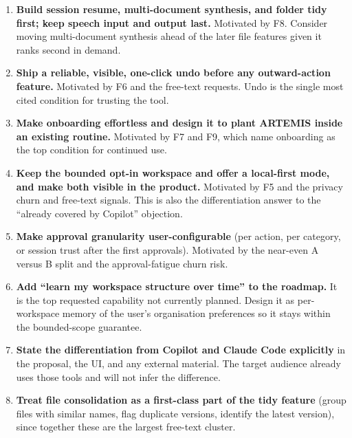 \documentclass[11pt]{article}
\begin{document}
\begin{enumerate}
  \item \textbf{Build session resume, multi-document synthesis, and folder tidy first; keep
        speech input and output last.} Motivated by F8. Consider moving multi-document synthesis
        ahead of the later file features given it ranks second in demand.
  \item \textbf{Ship a reliable, visible, one-click undo before any outward-action feature.}
        Motivated by F6 and the free-text requests. Undo is the single most cited condition for
        trusting the tool.
  \item \textbf{Make onboarding effortless and design it to plant ARTEMIS inside an existing
        routine.} Motivated by F7 and F9, which name onboarding as the top condition for
        continued use.
  \item \textbf{Keep the bounded opt-in workspace and offer a local-first mode, and make both
        visible in the product.} Motivated by F5 and the privacy churn and free-text signals.
        This is also the differentiation answer to the \enquote{already covered by Copilot}
        objection.
  \item \textbf{Make approval granularity user-configurable} (per action, per category, or
        session trust after the first approvals). Motivated by the near-even A versus B split
        and the approval-fatigue churn risk.
  \item \textbf{Add \enquote{learn my workspace structure over time} to the roadmap.} It is the
        top requested capability not currently planned. Design it as per-workspace memory of the
        user's organisation preferences so it stays within the bounded-scope guarantee.
  \item \textbf{State the differentiation from Copilot and Claude Code explicitly} in the
        proposal, the UI, and any external material. The target audience already uses those
        tools and will not infer the difference.
  \item \textbf{Treat file consolidation as a first-class part of the tidy feature}
        (group files with similar names, flag duplicate versions, identify the latest version),
        since together these are the largest free-text cluster.
\end{enumerate}
\end{document}
